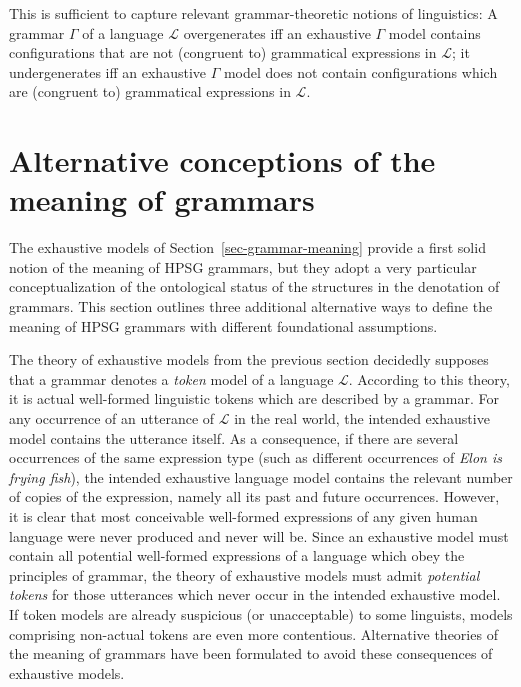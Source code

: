 \documentclass[output=paper
                ,modfonts
                ,nonflat
	        ,collection
	        ,collectionchapter
	        ,collectiontoclongg
 	        ,biblatex
                ,babelshorthands
                ,newtxmath
                ,draftmode
                ,colorlinks, citecolor=brown
]{./langsci/langscibook}
\begin{document}
{This is sufficient to capture relevant grammar-theoretic notions of
linguistics: A grammar $\Gamma$ of a language $\mathcal{L}$
overgenerates iff an exhaustive $\Gamma$ model contains configurations
that are not (congruent to) grammatical expressions in $\mathcal{L}$;
it undergenerates iff an exhaustive $\Gamma$ model does not contain
configurations which are (congruent to) grammatical expressions in
$\mathcal{L}$.




\section{Alternative conceptions of the meaning of grammars}
\label{sec-alt-gr-meaning}

The exhaustive models of Section~\ref{sec-grammar-meaning} provide a
first solid notion of the meaning of HPSG grammars, but they adopt a
very particular conceptualization of the ontological status of the
structures in the denotation of grammars. This section outlines three
additional alternative ways to define the meaning of HPSG grammars
with different foundational assumptions.


The theory of exhaustive models from the previous section decidedly supposes that a grammar
denotes a \emph{token} model of a language $\mathcal{L}$. According to
this theory, it is actual well-formed linguistic tokens which are
described by a grammar.  For any occurrence of an utterance of
$\mathcal{L}$ in the real world, the intended exhaustive model
contains the utterance itself. As a consequence, if there are several
occurrences of the same expression type (such as different occurrences
of {\em Elon is frying fish}), the intended exhaustive language model
contains the relevant number of copies of the expression, namely all
its past and future occurrences. However, it is clear that
most conceivable well-formed expressions of any given human language
were never produced and never will be. Since an exhaustive model must
contain all potential well-formed expressions of a language which obey
the principles of grammar, the theory of exhaustive models must admit
\emph{potential tokens} for those utterances which never occur in the
intended exhaustive model. If token models are already suspicious (or
unacceptable) to
some linguists, models comprising non-actual tokens are even more contentious.
Alternative theories of the meaning of grammars have been formulated
to avoid these consequences of exhaustive models.

}
\end{document}
